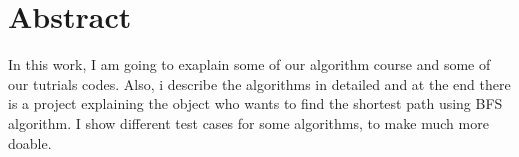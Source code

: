 \chapter*{Abstract}
\label{chap:abstract}
In this work, I am going to exaplain some of our algorithm course and some of our tutrials codes. Also, i describe the algorithms in detailed and at the end there is a project explaining the object who wants to find the shortest path using BFS algorithm. I show different test cases for some algorithms, to make much more doable.
